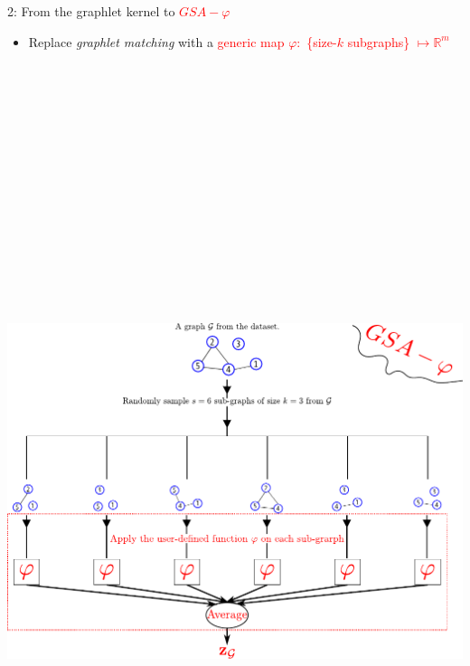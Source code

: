 \documentclass[final,dvipsnames]{beamer}
\newcommand{\myemph}[1]{\textcolor{red}{#1}}
\begin{document}
\begin{frame}{}
\begin{columns}[t]
\begin{column}{0.45\linewidth}
\begin{block}{2: From the graphlet kernel to \myemph{$GSA-\varphi$}}
\vspace{1cm}
\begin{itemize}
	\item Replace \emph{graphlet matching} with a \myemph{generic map} \myemph{$\varphi:$ \{size-$k$ subgraphs\} $\mapsto\mathbb{R}^m$}
\end{itemize}
\vspace{1cm}
\parbox{0.4\textwidth}{
	\includegraphics[height=25cm]{figs/GSA_phi.pdf} 
}
\end{block}
\end{column}
\end{columns}
\end{frame}
\end{document}
